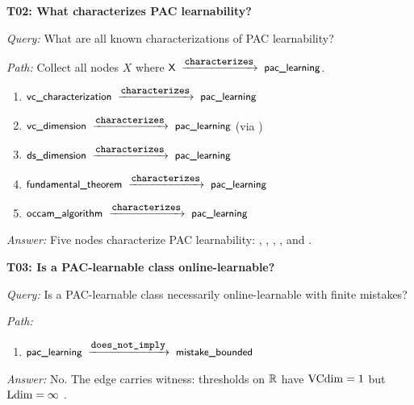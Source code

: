 \begin{traversal}
\textbf{T02: What characterizes PAC learnability?}\par\medskip
\emph{Query:} What are all known characterizations of PAC learnability?\par
\emph{Path:} Collect all nodes $X$ where $\edge{X}{characterizes}{pac\_learning}$.\par
\begin{enumerate}[leftmargin=2em, nosep]
  \item $\edge{vc\_characterization}{characterizes}{pac\_learning}$
  \item $\edge{vc\_dimension}{characterizes}{pac\_learning}$ (via )
  \item $\edge{ds\_dimension}{characterizes}{pac\_learning}$
  \item $\edge{fundamental\_theorem}{characterizes}{pac\_learning}$
  \item $\edge{occam\_algorithm}{characterizes}{pac\_learning}$
\end{enumerate}
\emph{Answer:} Five nodes characterize PAC learnability: , , , , and .
\end{traversal}

\begin{traversal}
\textbf{T03: Is a PAC-learnable class online-learnable?}\par\medskip
\emph{Query:} Is a PAC-learnable class necessarily online-learnable with finite mistakes?\par
\emph{Path:}\par
\begin{enumerate}[leftmargin=2em, nosep]
  \item $\edge{pac\_learning}{does\_not\_imply}{mistake\_bounded}$
\end{enumerate}
\emph{Answer:} No. The edge carries witness: thresholds on $\mathbb{R}$ have $\mathrm{VCdim} = 1$ but $\mathrm{Ldim} = \infty$ \cite{Littlestone1988}.
\end{traversal}

